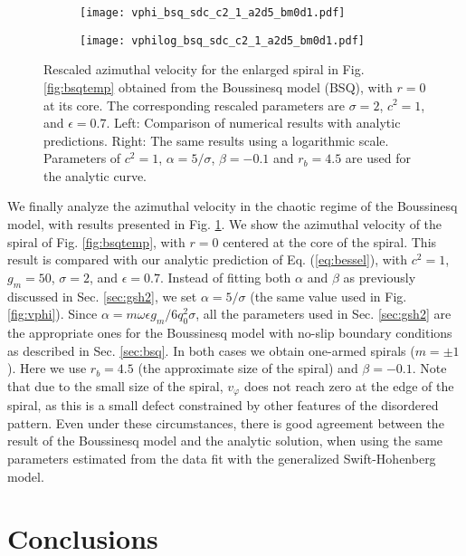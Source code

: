 \documentclass[preprint,prx,floatfix]{revtex4-1}
\begin{document}
\begin{figure}[htp]
	\centering
    \begin{subfigure}[b]{0.35\textwidth}
    \texttt{[image: vphi\_bsq\_sdc\_c2\_1\_a2d5\_bm0d1.pdf]}
    \end{subfigure}
    \begin{subfigure}[b]{0.35\textwidth}
    \texttt{[image: vphilog\_bsq\_sdc\_c2\_1\_a2d5\_bm0d1.pdf]}
    \end{subfigure}
    \caption{Rescaled azimuthal velocity for the enlarged spiral in Fig. \ref{fig:bsqtemp} obtained from the Boussinesq model (BSQ), with $r=0$ at its core. The corresponding rescaled parameters are $\sigma = 2$, $c^2 = 1$, and $\epsilon = 0.7$. Left: Comparison of numerical results with analytic predictions. Right: The same results using a logarithmic scale. Parameters of $c^2=1$, $\alpha = 5/\sigma$, $\beta = -0.1$ and $r_b = 4.5$ are used for the analytic curve.}
	\label{fig:bsqvphi}
\end{figure}

We finally analyze the azimuthal velocity in the chaotic regime of the Boussinesq model, with results presented in Fig. \ref{fig:bsqvphi}. We show the azimuthal velocity of the spiral of Fig. \ref{fig:bsqtemp}, with $r=0$ centered at the core of the spiral. This result is compared with our analytic prediction of Eq. (\ref{eq:bessel}), with $c^2 = 1$, $g_m = 50$, $\sigma = 2$, and $\epsilon = 0.7$. Instead of fitting both $\alpha$ and $\beta$ as previously discussed in Sec. \ref{sec:gsh2}, we set $\alpha = 5/\sigma$ (the same value used in Fig. \ref{fig:vphi}). Since $\alpha = m\omega\epsilon g_m/6q_0^2\sigma$, all the parameters used in Sec. \ref{sec:gsh2} are the appropriate ones for the Boussinesq model with no-slip boundary conditions as described in Sec. \ref{sec:bsq}. In both cases we obtain one-armed spirals ($m = \pm 1$). Here we use $r_b = 4.5$ (the approximate size of the spiral) and $\beta = -0.1$. Note that due to the small size of the spiral, $v_\varphi$ does not reach zero at the edge of the spiral, as this is a small defect constrained by other features of the disordered pattern. Even under these circumstances, there is good agreement between the result of the Boussinesq model and the analytic solution, when using the same parameters estimated from the data fit with the generalized Swift-Hohenberg model.

\section{Conclusions}
\end{document}
